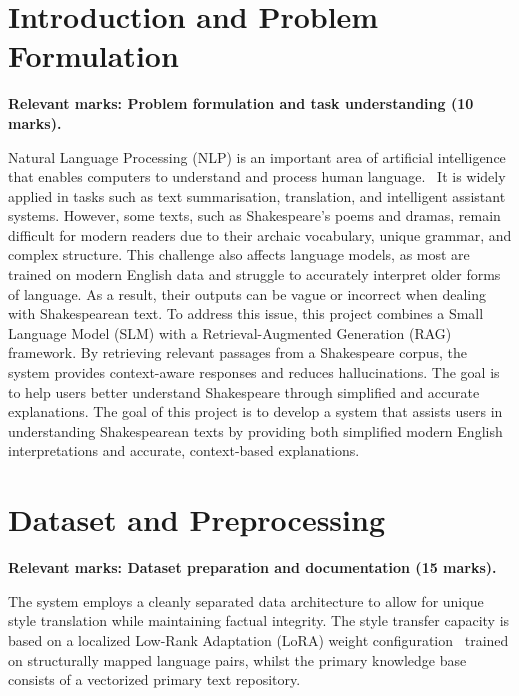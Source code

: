 \documentclass[10pt,conference]{IEEEtran}
\begin{document}
\section{Introduction and Problem Formulation}
\label{sec:introduction}

\textbf{Relevant marks: Problem formulation and task understanding (10 marks).}

Natural Language Processing (NLP) is an important area of artificial intelligence that enables computers to understand and process human language. ~\cite{khurana2023natural}It is widely applied in tasks such as text summarisation, translation, and intelligent assistant systems. However, some texts, such as Shakespeare’s poems and dramas, remain difficult for modern readers due to their archaic vocabulary, unique grammar, and complex structure. This challenge also affects language models, as most are trained on modern English data and struggle to accurately interpret older forms of language. As a result, their outputs can be vague or incorrect when dealing with Shakespearean text. To address this issue, this project combines a Small Language Model (SLM) with a Retrieval-Augmented Generation (RAG) framework. By retrieving relevant passages from a Shakespeare corpus, the system provides context-aware responses and reduces hallucinations. The goal is to help users better understand Shakespeare through simplified and accurate explanations. The goal of this project is to develop a system that assists users in understanding Shakespearean texts by providing both simplified modern English interpretations and accurate, context-based explanations. 


\section{Dataset and Preprocessing}
\label{sec:dataset}

\textbf{Relevant marks: Dataset preparation and documentation (15 marks).}

The system employs a cleanly separated data architecture to allow for unique style translation while maintaining factual integrity. The style transfer capacity is based on a localized Low-Rank Adaptation (LoRA) weight configuration~\cite{hu2022lora} trained on structurally mapped language pairs, whilst the primary knowledge base consists of a vectorized primary text repository. 
\end{document}

